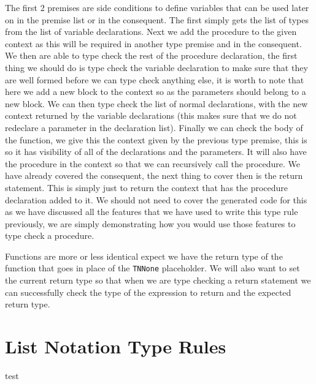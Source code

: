 The first 2 premises are side conditions to define variables that can be used later on in the premise list or in the consequent.
The first simply gets the list of types from the list of variable declarations.
Next we add the procedure to the given context as this will be required in another type premise and in the consequent.
We then are able to type check the rest of the procedure declaration, the first thing we should do is type check the variable declaration to make sure that they are well formed before we can type check anything else, it is worth to note that here we add a new block to the context so as the parameters should belong to a new block.
We can then type check the list of normal declarations, with the new context returned by the variable declarations (this makes sure that we do not redeclare a parameter in the declaration list).
Finally we can check the body of the function, we give this the context given by the previous type premise, this is so it has visibility of all of the declarations and the parameters.
It will also have the procedure in the context so that we can recursively call the procedure.
We have already covered the consequent, the next thing to cover then is the return statement.
This is simply just to return the context that has the procedure declaration added to it.
We should not need to cover the generated code for this as we have discussed all the features that we have used to write this type rule previously, we are simply demonstrating how you would use those features to type check a procedure.

Functions are more or less identical expect we have the return type of the function that goes in place of the \texttt{TNNone} placeholder.
We will also want to set the current return type so that when we are type checking a return statement we can successfully check the type of the expression to return and the expected return type.

\section{List Notation Type Rules}

\pagebreak
test
%
%
%
%
%